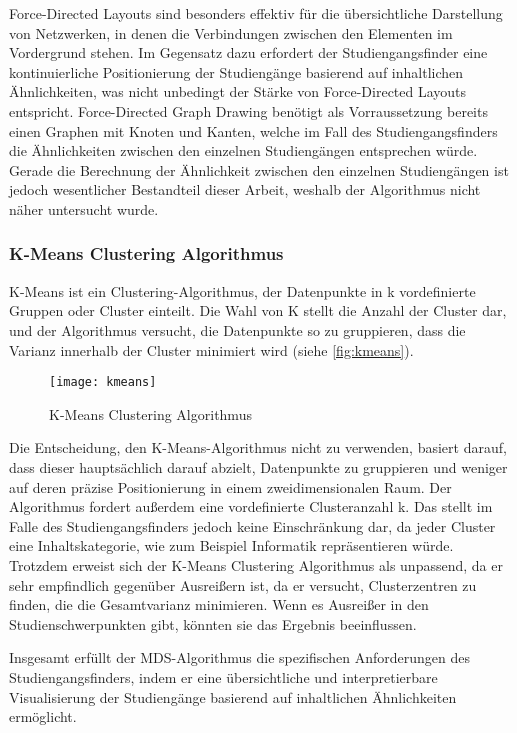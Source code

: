 Force-Directed Layouts sind besonders effektiv für die übersichtliche
Darstellung von Netzwerken, in denen die Verbindungen zwischen den Elementen im
Vordergrund stehen. \parencite{force-directed-layouts} Im Gegensatz dazu
erfordert der Studiengangsfinder eine kontinuierliche Positionierung der
Studiengänge basierend auf inhaltlichen Ähnlichkeiten, was nicht unbedingt der
Stärke von Force-Directed Layouts entspricht. Force-Directed Graph Drawing
benötigt als Vorraussetzung bereits einen Graphen mit Knoten und Kanten, welche
im Fall des Studiengangsfinders die Ähnlichkeiten zwischen den einzelnen
Studiengängen entsprechen würde. Gerade die Berechnung der Ähnlichkeit zwischen
den einzelnen Studiengängen ist jedoch wesentlicher Bestandteil dieser Arbeit,
weshalb der Algorithmus nicht näher untersucht wurde.

\subsubsection{K-Means Clustering Algorithmus}
K-Means ist ein Clustering-Algorithmus, der Datenpunkte in k vordefinierte
Gruppen oder Cluster einteilt. Die Wahl von K stellt die Anzahl der Cluster dar,
und der Algorithmus versucht, die Datenpunkte so zu gruppieren, dass die Varianz
innerhalb der Cluster minimiert wird (siehe \autoref{fig:kmeans}).
\parencite{kmeans}

\begin{figure}[H]
    \centering
    \texttt{[image: kmeans]}
    \caption{K-Means Clustering Algorithmus}
    \label{fig:kmeans}
\end{figure}

Die Entscheidung, den K-Means-Algorithmus nicht zu verwenden, basiert darauf,
dass dieser hauptsächlich darauf abzielt, Datenpunkte zu gruppieren und weniger
auf deren präzise Positionierung in einem zweidimensionalen Raum. Der
Algorithmus fordert außerdem eine vordefinierte Clusteranzahl k. Das stellt im
Falle des Studiengangsfinders jedoch keine Einschränkung dar, da jeder Cluster
eine Inhaltskategorie, wie zum Beispiel \glqq Informatik\grqq{} repräsentieren
würde. Trotzdem erweist sich der K-Means Clustering Algorithmus als unpassend,
da er sehr empfindlich gegenüber Ausreißern ist, da er versucht, Clusterzentren
zu finden, die die Gesamtvarianz minimieren. Wenn es Ausreißer in den
Studienschwerpunkten gibt, könnten sie das Ergebnis beeinflussen.
\parencite{kmeans-spikes}

Insgesamt erfüllt der MDS-Algorithmus die spezifischen Anforderungen des
Studiengangsfinders, indem er eine übersichtliche und interpretierbare
Visualisierung der Studiengänge basierend auf inhaltlichen Ähnlichkeiten
ermöglicht.

